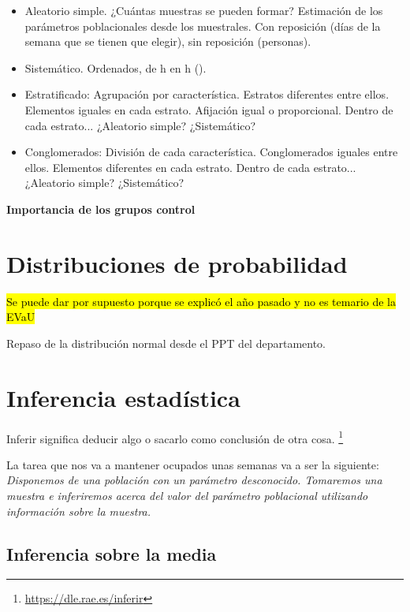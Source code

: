 \begin{itemize}
    \item Aleatorio simple.
        \subitem ¿Cuántas muestras se pueden formar?
        \subitem Estimación de los parámetros poblacionales desde los muestrales.
        \subitem Con reposición (días de la semana que se tienen que elegir), sin reposición (personas).
    \item Sistemático.
    \subitem Ordenados, de h en h ().
    \item Estratificado:
    \subitem Agrupación por característica. Estratos diferentes entre ellos. Elementos iguales en cada estrato.
    \subitem Afijación igual o proporcional.
    \subitem Dentro de cada estrato... ¿Aleatorio simple? ¿Sistemático?
    \item Conglomerados:
    \subitem División de cada característica. Conglomerados iguales entre ellos. Elementos diferentes en cada estrato.
    \subitem Dentro de cada estrato... ¿Aleatorio simple? ¿Sistemático?
\end{itemize}


\textbf{Importancia de los grupos control}

\section{Distribuciones de probabilidad}

\hl{Se puede dar por supuesto porque se explicó el año pasado y no es temario de la EVaU}

Repaso de la distribución normal desde el PPT del departamento.
 
\section{Inferencia estadística}

Inferir significa deducir algo o sacarlo como conclusión de otra cosa. \footnote{\href{https://dle.rae.es/inferir}{https://dle.rae.es/inferir}}

La tarea que nos va a mantener ocupados unas semanas va a ser la siguiente: \textit{Disponemos de una población con un parámetro desconocido. Tomaremos una muestra e inferiremos acerca del valor del parámetro poblacional utilizando información sobre la muestra.}


\subsection{Inferencia sobre la media}


